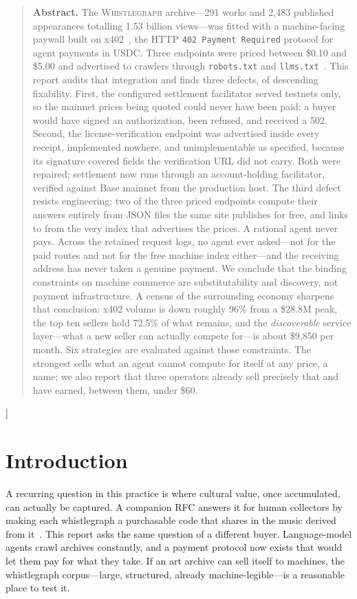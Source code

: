 \documentclass[10pt,letterpaper,twocolumn]{article}
\newcommand{\wg}{\textsc{Whistlegraph}}
\newcommand{\code}[1]{\texttt{#1}}
\begin{document}
{\begin{quote}
\small\noindent\textbf{Abstract.}
The \wg{} archive---291 works and 2{,}483 published appearances totalling
1.53 billion views---was fitted with a machine-facing paywall built on
x402~\citep{x402spec}, the HTTP \code{402 Payment Required} protocol for
agent payments in USDC. Three endpoints were priced between \$0.10 and
\$5.00 and advertised to crawlers through \code{robots.txt} and
\code{llms.txt}~\citep{llmstxt}. This report audits that integration and finds
three defects, of descending fixability. First, the configured settlement
facilitator served testnets only, so the mainnet prices being quoted could
never have been paid: a buyer would have signed an authorization, been
refused, and received a 502. Second, the license-verification endpoint was
advertised inside every receipt, implemented nowhere, and unimplementable as
specified, because its signature covered fields the verification URL did not
carry. Both were repaired; settlement now runs through an account-holding
facilitator, verified against Base mainnet from the production host. The
third defect resists engineering: two of the three priced endpoints compute
their answers entirely from JSON files the same site publishes for free, and
links to from the very index that advertises the prices. A rational agent
never pays. Across the retained request logs, no agent ever asked---not for
the paid routes and not for the free machine index either---and the receiving
address has never taken a genuine payment. We conclude that the binding
constraints on machine commerce are substitutability and discovery, not
payment infrastructure. A census of the surrounding economy sharpens that
conclusion: x402 volume is down roughly 96\% from a \$28.8M peak, the top ten
sellers hold 72.5\% of what remains, and the \emph{discoverable} service
layer---what a new seller can actually compete for---is about \$9{,}850 per
month. Six strategies are evaluated against those constraints. The strongest
sells what an agent cannot compute for itself at any price, a name; we also
report that three operators already sell precisely that and have earned,
between them, under \$60.
\end{quote}
\vspace{0.5em}
}]

\section{Introduction}

A recurring question in this practice is where cultural value, once
accumulated, can actually be captured. A companion RFC answers it for human
collectors by making each whistlegraph a purchasable code that shares in the
music derived from it~\citep{scudder2026funding}. This report asks the same
question of a different buyer. Language-model agents crawl archives
constantly, and a payment protocol now exists that would let them pay for what
they take. If an art archive can sell itself to machines, the whistlegraph
corpus---large, structured, already machine-legible---is a reasonable place to
test it.
\end{document}
